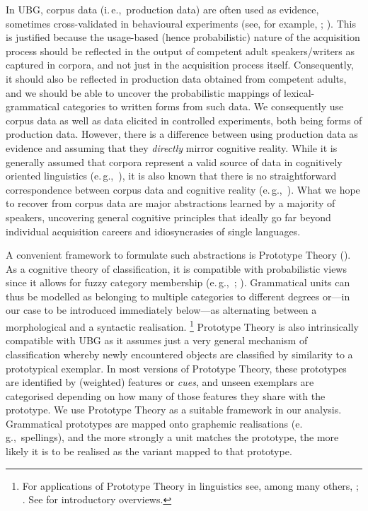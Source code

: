 \documentclass[biblatex, charis, linguex]{glossa}\usepackage{knitr}
\newcommand{\ie}{i.\,e.,\ }
\newcommand{\egg}{e.\,g.,\ }
\begin{document}
In UBG, corpus data (\ie production data) are often used as evidence, sometimes cross-validated in behavioural experiments (see, for example, \citealt{ArppeJaervikivi2007,BresnanEa2007,Dabrowska2014,Divjak2016a,DivjakEa2016a,FordBresnan2013,PankratzVantiel2021}; \citealt{Schaefer2018,SchaeferPankratz2018}).
This is justified because the usage-based (hence probabilistic) nature of the acquisition process should be reflected in the output of competent adult speakers\slash writers as captured in corpora, and not just in the acquisition process itself.
Consequently, it should also be reflected in production data obtained from competent adults, and we should be able to uncover the probabilistic mappings of lexical-grammatical categories to written forms from such data.
We consequently use corpus data as well as data elicited in controlled experiments, both being forms of production data.
However, there is a difference between using production data as evidence and assuming that they \textit{directly} mirror cognitive reality.
While it is generally assumed that corpora represent a valid source of data in cognitively oriented linguistics (\egg \citealt{Newman2011}), it is also known that there is no straightforward correspondence between corpus data and cognitive reality (\egg \citealt{Gries2003,Dabrowska2016}).
What we hope to recover from corpus data are major abstractions learned by a majority of speakers, uncovering general cognitive principles that ideally go far beyond individual acquisition careers and idiosyncrasies of single languages.

A convenient framework to formulate such abstractions is Prototype Theory (\citealt{Rosch1973,Rosch1978}).
As a cognitive theory of classification, it is compatible with probabilistic views since it allows for fuzzy category membership (\egg \citealt{Sutcliffe1993}; \citealt[11--16]{Murphy2002}).
Grammatical units can thus be modelled as belonging to multiple categories to different degrees or---in our case to be introduced immediately below---as alternating between a morphological and a syntactic realisation.%
\footnote{For applications of Prototype Theory in linguistics see, among many others, \citet{DivjakArppe2013,Dobric2015,Gilquin2006,Gries2003}; \citet{Schaefer2019a}.
See \citet{Taylor2003,Taylor2008} for introductory overviews.}
Prototype Theory is also intrinsically compatible with UBG as it assumes just a very general mechanism of classification whereby newly encountered objects are classified by similarity to a prototypical exemplar.
In most versions of Prototype Theory, these prototypes are identified by (weighted) features or \textit{cues}, and unseen exemplars are categorised depending on how many of those features they share with the prototype.
We use Prototype Theory as a suitable framework in our analysis.
Grammatical prototypes are mapped onto graphemic realisations (\egg spellings), and the more strongly a unit matches the prototype, the more likely it is to be realised as the variant mapped to that prototype.
\end{document}
